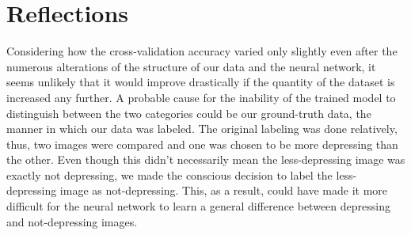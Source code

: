 \documentclass[letterpaper]{article}
\begin{document}
\section{Reflections}
Considering how the cross-validation accuracy varied only slightly even after the numerous alterations of the structure of our data and the neural network, it seems unlikely that it would improve drastically if the quantity of the dataset is increased any further. A probable cause for the inability of the trained model to distinguish between the two categories could be our ground-truth data, the manner in which our data was labeled. The original labeling was done relatively, thus, two images were compared and one was chosen to be more depressing than the other. Even though this didn't necessarily mean the less-depressing image was exactly not depressing, we made the conscious decision to label the less-depressing image as not-depressing. This, as a result, could have made it more difficult for the neural network to learn a general difference between depressing and not-depressing images. 






%
%
\end{document}
